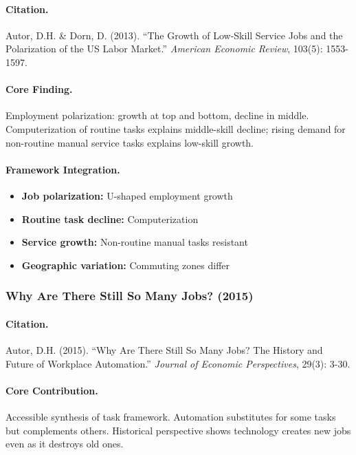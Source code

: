 \documentclass[12pt,a4paper]{article}
\begin{document}
\paragraph{Citation.}
Autor, D.H. \& Dorn, D. (2013). ``The Growth of Low-Skill Service Jobs
and the Polarization of the US Labor Market.''
\emph{American Economic Review}, 103(5): 1553-1597.

\paragraph{Core Finding.}
Employment polarization: growth at top and bottom, decline in middle.
Computerization of routine tasks explains middle-skill decline; rising
demand for non-routine manual service tasks explains low-skill growth.

\paragraph{Framework Integration.}
\begin{itemize}
  \item \textbf{Job polarization:} U-shaped employment growth
  \item \textbf{Routine task decline:} Computerization
  \item \textbf{Service growth:} Non-routine manual tasks resistant
  \item \textbf{Geographic variation:} Commuting zones differ
\end{itemize}

\subsubsection{Why Are There Still So Many Jobs? (2015)}

\paragraph{Citation.}
Autor, D.H. (2015). ``Why Are There Still So Many Jobs? The History and
Future of Workplace Automation.''
\emph{Journal of Economic Perspectives}, 29(3): 3-30.

\paragraph{Core Contribution.}
Accessible synthesis of task framework. Automation substitutes for some
tasks but complements others. Historical perspective shows technology
creates new jobs even as it destroys old ones.
\end{document}

